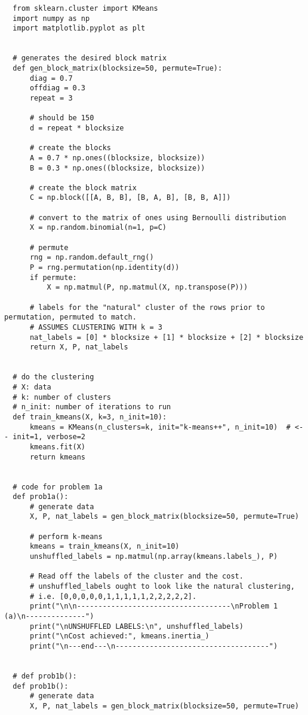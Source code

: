 \begin{verbatim}  
  from sklearn.cluster import KMeans
  import numpy as np
  import matplotlib.pyplot as plt


  # generates the desired block matrix
  def gen_block_matrix(blocksize=50, permute=True):
      diag = 0.7
      offdiag = 0.3
      repeat = 3

      # should be 150
      d = repeat * blocksize

      # create the blocks
      A = 0.7 * np.ones((blocksize, blocksize))
      B = 0.3 * np.ones((blocksize, blocksize))

      # create the block matrix
      C = np.block([[A, B, B], [B, A, B], [B, B, A]])

      # convert to the matrix of ones using Bernoulli distribution
      X = np.random.binomial(n=1, p=C)

      # permute
      rng = np.random.default_rng()
      P = rng.permutation(np.identity(d))
      if permute:
          X = np.matmul(P, np.matmul(X, np.transpose(P)))

      # labels for the "natural" cluster of the rows prior to permutation, permuted to match.
      # ASSUMES CLUSTERING WITH k = 3
      nat_labels = [0] * blocksize + [1] * blocksize + [2] * blocksize
      return X, P, nat_labels


  # do the clustering
  # X: data
  # k: number of clusters
  # n_init: number of iterations to run
  def train_kmeans(X, k=3, n_init=10):
      kmeans = KMeans(n_clusters=k, init="k-means++", n_init=10)  # <-- init=1, verbose=2
      kmeans.fit(X)
      return kmeans


  # code for problem 1a
  def prob1a():
      # generate data
      X, P, nat_labels = gen_block_matrix(blocksize=50, permute=True)

      # perform k-means
      kmeans = train_kmeans(X, n_init=10)
      unshuffled_labels = np.matmul(np.array(kmeans.labels_), P)

      # Read off the labels of the cluster and the cost.
      # unshuffled_labels ought to look like the natural clustering,
      # i.e. [0,0,0,0,0,1,1,1,1,1,2,2,2,2,2].
      print("\n\n------------------------------------\nProblem 1 (a)\n--------------")
      print("\nUNSHUFFLED LABELS:\n", unshuffled_labels)
      print("\nCost achieved:", kmeans.inertia_)
      print("\n---end---\n------------------------------------")


  # def prob1b():
  def prob1b():
      # generate data
      X, P, nat_labels = gen_block_matrix(blocksize=50, permute=True)


\end{verbatim}
